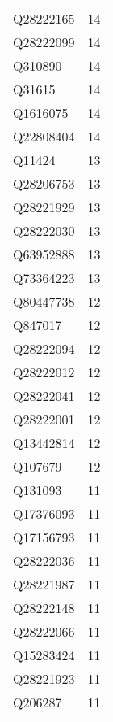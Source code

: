 \begin{tabular}{lr}
   Q28222165 &                            14 \\
   Q28222099 &                            14 \\
     Q310890 &                            14 \\
      Q31615 &                            14 \\
    Q1616075 &                            14 \\
   Q22808404 &                            14 \\
      Q11424 &                            13 \\
   Q28206753 &                            13 \\
   Q28221929 &                            13 \\
   Q28222030 &                            13 \\
   Q63952888 &                            13 \\
   Q73364223 &                            13 \\
   Q80447738 &                            12 \\
     Q847017 &                            12 \\
   Q28222094 &                            12 \\
   Q28222012 &                            12 \\
   Q28222041 &                            12 \\
   Q28222001 &                            12 \\
   Q13442814 &                            12 \\
     Q107679 &                            12 \\
     Q131093 &                            11 \\
   Q17376093 &                            11 \\
   Q17156793 &                            11 \\
   Q28222036 &                            11 \\
   Q28221987 &                            11 \\
   Q28222148 &                            11 \\
   Q28222066 &                            11 \\
   Q15283424 &                            11 \\
   Q28221923 &                            11 \\
     Q206287 &                            11 \\

\end{tabular}
